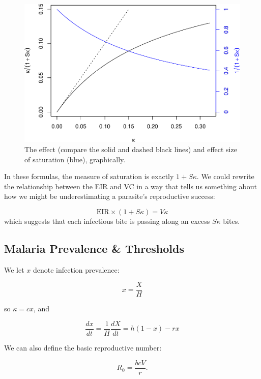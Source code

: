 \documentclass[
]{book}
\begin{document}
\begin{figure}
\centering
\includegraphics{docs/figs/unnamed-chunk-76-1.pdf}
\caption{\label{fig:unnamed-chunk-76}The effect (compare the solid and dashed black lines) and effect size of saturation (blue), graphically.}
\end{figure}

In these formulas, the measure of saturation is exactly \(1+S\kappa\). We could rewrite the relationship between the EIR and VC in a way
that tells us something about how we might be underestimating a parasite's reproductive success:

\[\mbox{EIR}\times (1 + S \kappa) = V \kappa\]
which suggests that each infectious bite is passing along an excess \(S\kappa\) bites.

\subsection{Malaria Prevalence \& Thresholds}\label{malaria-prevalence-thresholds}

We let \(x\) denote infection prevalence:

\begin{equation}
x = \frac{X}{H} 
\end{equation}

so \(\kappa = c x\), and

\begin{equation}
\frac{dx}{dt} = \frac{1}{H} \frac{dX}{dt} = h (1-x)-r x
\end{equation}

We can also define the basic reproductive number:

\begin{equation}
R_0 = \frac{bcV}{r}.
\end{equation}
\end{document}
